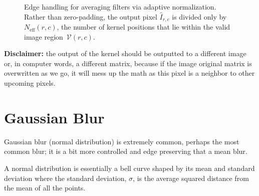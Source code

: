 \documentclass[11pt]{article}
\begin{document}
\begin{figure}[htbp]
\caption{Edge handling for averaging filters via adaptive normalization.
Rather than zero-padding, the output pixel $\hat{I}_{r,c}$ is divided only by
$N_{\mathrm{eff}}(r,c)$, the number of kernel positions that lie within the
valid image region~$\mathcal{V}(r,c)$.}
\label{fig:edge-handling}
\end{figure}


\noindent\textbf{Disclaimer:} the output of the kernel should be outputted to a different image or, in computer words, a different matrix, because if the image original matrix is overwritten as we go, it will mess up the math as this pixel is a neighbor to other upcoming pixels.

\section{Gaussian Blur}
Gaussian blur (normal distribution) is extremely common, perhaps the most common blur; it is a bit more controlled and edge preserving that a mean blur.

\noindent A normal distribution is essentially a bell curve shaped by its mean and standard deviation where the standard deviation, $\sigma$, is the average squared distance from the mean of all the points.
\end{document}

